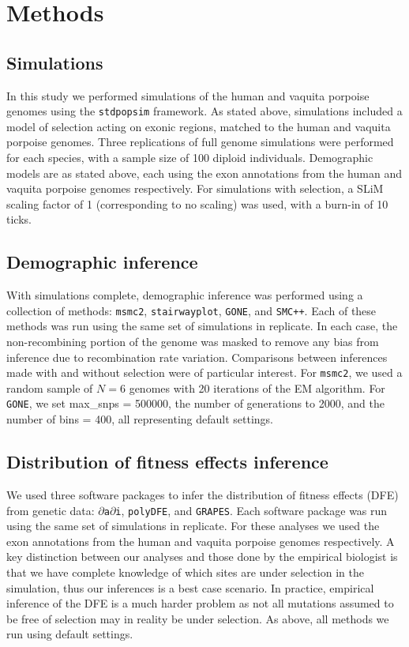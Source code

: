 \documentclass[hidelinks]{article}
\newcommand{\stdpopsim}{\texttt{stdpopsim}\xspace}
\newcommand{\msmc}{\texttt{msmc2}\xspace}
\newcommand{\stairway}{\texttt{stairwayplot}\xspace}
\newcommand{\gone}{\texttt{GONE}\xspace}
\newcommand{\smcpp}{\texttt{SMC++}\xspace}
\newcommand{\polydfe}{\texttt{polyDFE}\xspace}
\newcommand{\dadi}{$\partial$\texttt{a}$\partial$\texttt{i}\xspace}
\newcommand{\grapes}{\texttt{GRAPES}\xspace}
\begin{document}
\section*{Methods}
    \label{methods}

    \subsection*{Simulations}
    In this study we performed simulations of the human and vaquita porpoise genomes
    using the \stdpopsim{} framework. As stated above, simulations included a model 
    of selection acting on exonic regions, matched to the human and vaquita porpoise genomes.
    Three replications of full genome simulations were performed for each species, with 
    a sample size of 100 diploid individuals. Demographic models are as stated above, each
    using the exon annotations from the human and vaquita porpoise genomes respectively.
    For simulations with selection, a SLiM scaling factor of 1 (corresponding to no scaling)
    was used, with a burn-in of 10 ticks. 

    \subsection*{Demographic inference}
    With simulations complete, demographic inference was performed using a collection of methods:
    \msmc \citep{Schiffels2020}, \stairway \citep{liu2020stairway}, \gone \citep{santiago2020recent}, and \smcpp \citep{terhorst2017robust}.
    Each of these methods was run using the same set of simulations in replicate.
    In each case, the non-recombining portion
    of the genome was masked to remove any bias from inference due to recombination rate
    variation. Comparisons between inferences made with and without selection were 
    of particular interest. For \msmc, we used a random sample of $N=6$ genomes with 20
    iterations of the EM algorithm. For \gone, we set max\_snps = 500000,
    the number of generations to 2000, and the number of bins = 400, all representing default settings.
    

    \subsection*{Distribution of fitness effects inference}
    We used three software packages to infer the distribution of fitness effects (DFE) from genetic data:
    \dadi \citep{gutenkunst2009inferring,kim2017inference}, \polydfe \citep{tataru2020polydfe}, and \grapes \citep{galtier2016adaptive}.
    Each software package was run using the same set of simulations in replicate.   
    For these analyses we used the exon annotations from the human and vaquita porpoise genomes respectively.
    A key distinction between our analyses and those done by the empirical biologist
    is that we have complete knowledge of which sites are under selection in the simulation,
    thus our inferences is a best case scenario. In practice, empirical inference of the DFE is a much
    harder problem as not all mutations assumed to be free of selection
    may in reality be under selection. As above, all methods we run using default settings.
\end{document}
